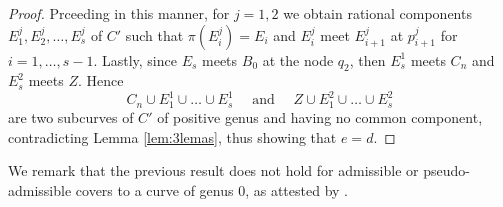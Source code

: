 \documentclass{article}
\newcommand{\ee}{\quad\text{ and }\quad}
\renewcommand{\:}{\colon }
\begin{document}
\begin{proof}
Prceeding in this manner, for $j=1,2$ we obtain rational components 
$E_1^j,E_2^j,\ldots, E_{s}^j$  of $C'$
such that  $\pi(E_i^j)=E_i$
and
$E^j_i$ meet $E^j_{i+1}$ at $p^j_{i+1}$ for $i=1,\ldots,s-1$.
Lastly, since $E_{s}$ meets $B_0$ at the node $q_2$, then 
$ E_{s}^1$ meets $C_n$ and 
$ E_{s}^2$ meets $Z$.
Hence 
$$C_n \cup E_1^1 \cup \ldots \cup E_s^1 
\ee
Z\cup E_1^2\cup \ldots \cup E_s^2$$
are two subcurves of ${C}'$ of positive genus and having no common component, contradicting Lemma \ref{lem:3lemas}, thus showing that $e=d$.
 \end{proof}   

We remark that the previous result  does not hold for admissible or pseudo-admissible covers to a curve of genus 0, as attested by \cite[Theorem 3.3 and Corollary 3.5]{paper1}. 
\end{document}
